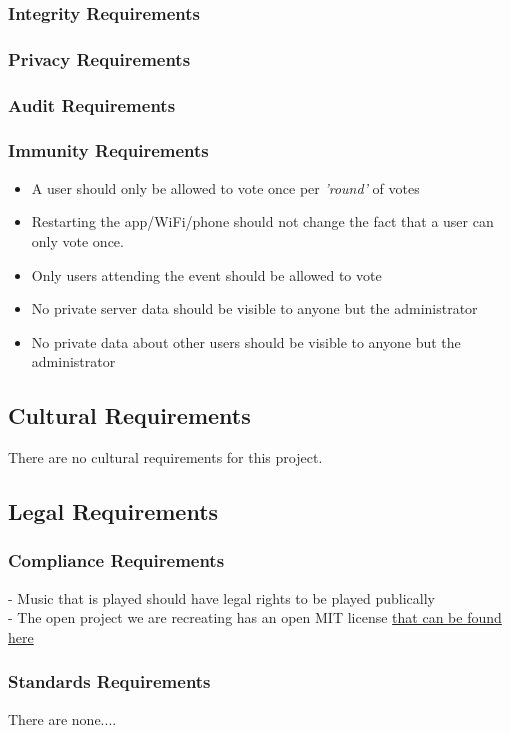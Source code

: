 \documentclass[12pt, titlepage]{article}
\begin{document}
\subsubsection{Integrity Requirements}
\subsubsection{Privacy Requirements}
\subsubsection{Audit Requirements}
\subsubsection{Immunity Requirements}
\begin{itemize}
\item A user should only be allowed to vote once per \textit{'round'} of votes
\item Restarting the app/WiFi/phone should not change the fact that a user can
only vote once.
\item Only users attending the event should be allowed to vote
\item No private server data should be visible to anyone but the administrator
\item No private data about other users should be visible to anyone but the
administrator
\end{itemize}

\subsection{Cultural Requirements}
There are no cultural requirements for this project.
\subsection{Legal Requirements}
\subsubsection{Compliance Requirements}

- Music that is played should have legal rights to be played publically \\
- The open project we are recreating has an open MIT license \href{LICENSE.txt} {that can be found here}\\
\subsubsection{Standards Requirements}
There are none....
\end{document}
